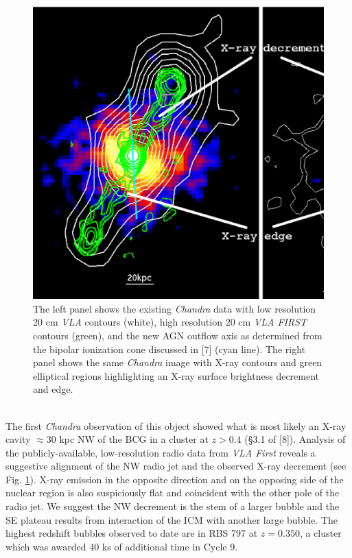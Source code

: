 \documentclass[letterpaper,11pt,twocolumn]{article}
\begin{document}
\begin{figure}
\begin{center}
\includegraphics*[width=\columnwidth, trim=0mm 0mm 0mm 0mm, clip]{chan_vla_utrao}
\caption{
The left panel shows the existing {\textit{Chandra}} data with low
resolution 20 cm {\it{VLA}} contours (white), high resolution 20 cm
{\it{VLA FIRST}} contours (green), and the new AGN outflow axis as
determined from the bipolar ionization cone discussed in
[7] (cyan line). The right panel shows the same
{\textit{Chandra}} image with X-ray contours and green elliptical
regions highlighting an X-ray surface brightness decrement and edge.
}
\label{fig:chanrad}
\end{center}
\end{figure}

\\
The first {\it{Chandra}} observation of this object showed 
what is most likely an X-ray cavity $\approx
30$ kpc NW of the BCG in a cluster at $z > 0.4$ (\S{3.1} of
[8]). Analysis of the publicly-available,
low-resolution radio data from {\it{VLA First}} reveals a suggestive
alignment of the NW radio jet and the observed X-ray decrement (see
Fig. \ref{fig:chanrad}). X-ray emission in the opposite direction and
on the opposing side of the nuclear region is also suspiciously flat
and coincident with the other pole of the radio jet. We suggest the NW
decrement is the stem of a larger bubble and the SE plateau results
from interaction of the ICM with another large bubble. The highest
redshift bubbles observed to date are in RBS 797 at $z = 0.350$, a
cluster which was awarded 40 ks of additional time in Cycle 9.
\end{document}
